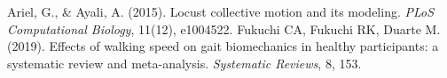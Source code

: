 \documentclass[11pt,a4paper]{article}
\begin{document}
\begin{thebibliography}{9}
Ariel, G., \& Ayali, A. (2015). Locust collective motion and its modeling. \emph{PLoS Computational Biology}, 11(12), e1004522.
Fukuchi CA, Fukuchi RK, Duarte M. (2019). Effects of walking speed on gait biomechanics in healthy participants: a systematic review and meta-analysis. \emph{Systematic Reviews}, 8, 153.
\end{thebibliography}
\end{document}
